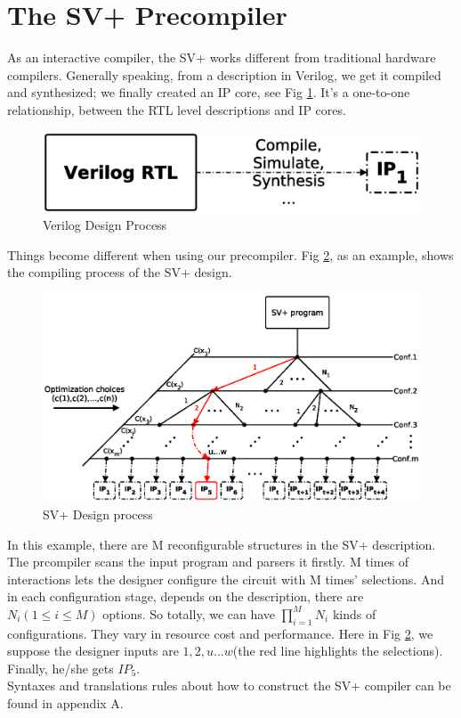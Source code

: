 \section{The SV+ Precompiler}\label{sec:compiler}
As an interactive compiler, the SV+ works different from traditional hardware compilers.
Generally speaking, from a description in Verilog, we get it compiled and synthesized; we finally created an IP core, see Fig \ref{fig-ipdesign}. It's a one-to-one relationship, between the RTL level descriptions and IP cores.
\begin{figure}[htbp]
\centering
\includegraphics[width=0.5\columnwidth]{IPDesign}
\caption{Verilog Design Process}
\label{fig-ipdesign}
\end{figure}

Things become different when using our precompiler. Fig \ref{fig-compiler}, as an example, shows the compiling process of the SV+ design.   
\begin{figure}[htbp]
\centering
\includegraphics[scale=.4]{compileprocess}
\caption{SV+ Design process}
\label{fig-compiler}
\end{figure}
In this example, there are M reconfigurable structures in the SV+ description. The prcompiler scans the input program and parsers it firstly. M times of interactions lets the designer configure the circuit with M times' selections. And in each configuration stage, depends on the description, there are $N_i (1\leq i\leq M)$ options. So totally, we can have $\prod_{i=1}^{M}N_{i}$ kinds of configurations. They vary in resource cost and performance. Here in Fig \ref{fig-compiler}, we suppose the designer inputs are $1,2,u...w$(the red line highlights the selections). Finally, he/she gets $\mathit{IP_5}$.
\\
Syntaxes and translations rules about how to construct the SV+ compiler can be found in appendix A.